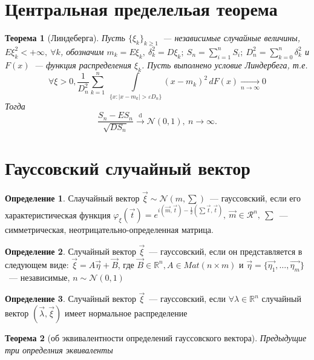 \documentclass[11pt, a5paper]{article}
\newtheorem{theorem}{Теорема}[section]
\theoremstyle{definition}\newtheorem{definition}{Определение}
\begin{document}
\section{Центральная пределельая теорема}
	\begin{theorem}[Линдеберга]
	 Пусть $\{\xi_k\}_{k \geqslant 1}$~--- независимые случайные величины, $E\xi_k^2 <+ \infty,~\forall k$, обозначим $m_k=E\xi_k,~\delta_k^2=D\xi_k;~S_n=\sum\limits_{i=1}^{n}S_i;~D_n^2 = \sum\limits_{k=0}^{n}\delta_k^2$ и $F(x)$~--- функция распределения $\xi_k$. Пусть выполнено условие Линдербега, т.е.
	 $$\forall\xi>0,\frac{1}{D_n^2}\sum\limits_{k=1}^{n}~ \int\limits_{\{x:\mid x-m_k\mid >\varepsilon D_n\}} (x-m_k)^2\,dF(x) \xrightarrow[n \rightarrow \infty]{} 0 $$
	 Тогда  $$ \frac{S_n-ES_n}{\sqrt{DS_n}}\overset{\text{d}}{\longrightarrow} \mathcal{N} (0,1),~n \rightarrow \infty.$$
	\end{theorem}
	\section{Гауссовский случайный вектор}
	\begin{definition}
Слаучайный вектор $\vec{\xi} \sim \mathcal{N}(m,\sum)$~--- гауссовский, если его характеристическая функция $\varphi_\xi(\vec{t})=e^{i(\vec{m},\vec{t}) -\frac{1}{2}(\sum\vec{t},\vec{t})},~\vec{m} \in \mathcal{R}^n,~\sum$~--- симметрическая, неотрицательно-определенная матрица.
	\end{definition}
	\begin{definition}
Случайный вектор $\vec{\xi}$~--- гауссовский, если он представляется в следующем виде: $\vec{\xi} = A\vec{\eta} + \vec{B}$, где $\vec{B} \in \mathbb{R}^n,A \in Mat(n \times m)$ и $\vec{\eta} = \{\vec{\eta_1}, \ldots,\vec{\eta_m} \}$~--- независимые, $n \sim \mathcal{N}(0,1)$
	\end{definition}
	\begin{definition}
Случайный вектор $\vec{\xi}$~--- гауссовский, если $\forall \lambda \in \mathbb{R}^n$ случайный вектор $(\vec{\lambda}, \vec{\xi})$ имеет нормальное распределение
	\end{definition}
	\begin{theorem}[об эквивалентности определений гауссовского вектора]
		Предыдущие три определния эквиваленты
	\end{theorem}
\end{document}
